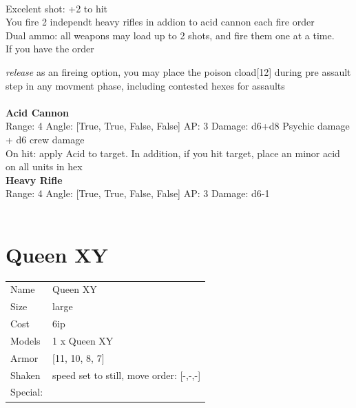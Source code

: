 \ \\
Excelent shot: +2 to hit\\ 
You fire 2 independt heavy rifles in addion to acid cannon each fire order\\ 
Dual ammo: all weapons may load up to 2 shots, and fire them one at a time.\\ 
If you have the order {{\it release} as an fireing option, you may place the poison cload[12] during pre assault step in any movment phase, including contested hexes for assaults\\ 

\ \\
{\bf Acid Cannon } \\



Range: 4  Angle: [True, True, False, False] AP: 3 Damage: d6+d8 Psychic damage + d6 crew damage \\
On hit: apply Acid to target. In addition, if you hit target, place an minor acid on all units in hex\\ 




{\bf Heavy Rifle } \\



Range: 4  Angle: [True, True, False, False] AP: 3 Damage: d6-1 \\




 
\ \\













\clearpage

\section{ Queen XY }

\begin{tabular}{ll}
  Name & Queen XY \\
  Size & large\\
  Cost & 6ip\\
  Models & 1 x Queen XY\\
  Armor & [11, 10, 8, 7]\\
  Shaken & speed set to still, move order: [-,-,-]\\
  Special: \\
\end{tabular}

}
